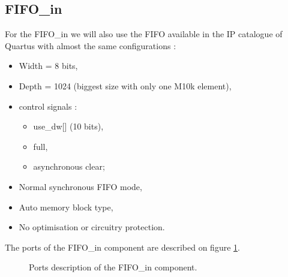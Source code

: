 \documentclass[11pt]{article}
\begin{document}
\subsection{FIFO\_in}
For the FIFO\_in we will also use the FIFO available in the IP catalogue of Quartus with almost the same configurations :
\begin{itemize}
    \item Width = 8 bits,
    \item Depth = 1024 (biggest size with only one M10k element),
    \item control signals : \begin{itemize}
        \item use\_dw[] (10 bits),
        \item full,
        \item asynchronous clear; \end{itemize}
    \item Normal synchronous FIFO mode,
    \item Auto memory block type,
    \item No optimisation or circuitry protection.
\end{itemize}

The ports of the FIFO\_in component are described on figure \ref{fifo_in_ports}.
\begin{figure}[H]
        \caption{Ports description of the FIFO\_in component.}
        \label{fifo_in_ports}
\end{figure}
\end{document}
